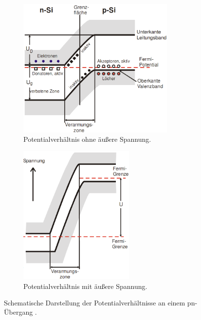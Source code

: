 \begin{figure}[H]
	\centering
	\begin{subfigure}[b]{0.45\linewidth}
		\includegraphics[height=7cm]{Bilder/V1.png}
		\caption{Potentialverhältnis ohne äußere Spannung.}
		\label{fig:Potentiala}
	\end{subfigure}
	\hfill
	\begin{subfigure}[b]{0.45\linewidth}
		\includegraphics[height=7cm]{Bilder/V2.png}
		\caption{Potentialverhältnis mit äußere Spannung.}
		\label{fig:Potentialb}
	\end{subfigure}
	\caption{Schematische Darstellung der Potentialverhältnisse an einem pn-Übergang \cite{V18}.}
	\label{fig:Potential}
\end{figure}


